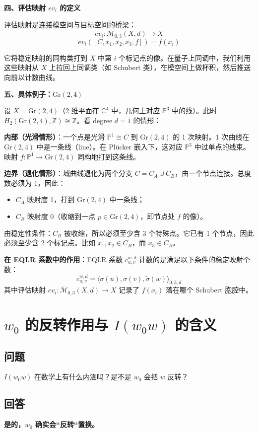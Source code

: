 \textbf{四、评估映射 $ev_i$ 的定义}

评估映射是连接模空间与目标空间的桥梁：
$$ev_i: \overline{\mathcal{M}}_{0,3}(X,d) \to X$$
$$ev_i([C, x_1, x_2, x_3, f]) = f(x_i)$$

它将稳定映射的同构类打到 $X$ 中第 $i$ 个标记点的像。在量子上同调中，我们利用这些映射从 $X$ 上拉回上同调类（如 Schubert 类），在模空间上做杯积，然后推送向前以计数曲线。

\textbf{五、具体例子：$\mathrm{Gr}(2,4)$}

设 $X = \mathrm{Gr}(2,4)$（2 维平面在 $\mathbb{C}^4$ 中，几何上对应 $\mathbb{P}^3$ 中的线）。此时 $H_2(\mathrm{Gr}(2,4), \mathbb{Z}) \cong \mathbb{Z}$。看 degree $d=1$ 的情形：

\textbf{内部（光滑情形）}：一个点是光滑 $\mathbb{P}^1 \cong C$ 到 $\mathrm{Gr}(2,4)$ 的 1 次映射。1 次曲线在 $\mathrm{Gr}(2,4)$ 中是一条线（line）。在 Plücker 嵌入下，这对应 $\mathbb{P}^3$ 中过单点的线束。映射 $f: \mathbb{P}^1 \to \mathrm{Gr}(2,4)$ 同构地打到这条线。

\textbf{边界（退化情形）}：域曲线退化为两个分支 $C = C_A \cup C_B$，由一个节点连接。总度数必须为 1，因此：
\begin{itemize}
\item $C_A$ 映射度 1，打到 $\mathrm{Gr}(2,4)$ 中一条线；
\item $C_B$ 映射度 0（收缩到一点 $p \in \mathrm{Gr}(2,4)$，即节点处 $f$ 的像）。
\end{itemize}
由稳定性条件：$C_B$ 被收缩，所以必须至少含 3 个特殊点。它已有 1 个节点，因此必须至少含 2 个标记点。比如 $x_1, x_2 \in C_B$，而 $x_3 \in C_A$。

\textbf{在 EQLR 系数中的作用}：EQLR 系数 $c_{u,v}^{w,d}$ 计数的是满足以下条件的稳定映射个数：
$$c_{u,v}^{w,d} = \langle \sigma(u), \sigma(v), \widetilde{\sigma}(w) \rangle_{0,3,d}$$
其中评估映射 $ev_i: \overline{\mathcal{M}}_{0,3}(X,d) \to X$ 记录了 $f(x_i)$ 落在哪个 Schubert 胞腔中。
\section{$w_0$ 的反转作用与 $I(w_0 w)$ 的含义}\label{sec:w0-inversion}
\subsection{问题}
$I(w_0 w)$ 在数学上有什么内涵吗？是不是 $w_0$ 会把 $w$ 反转？
\subsection{回答}
\textbf{是的，$w_0$ 确实会``反转``置换。}

